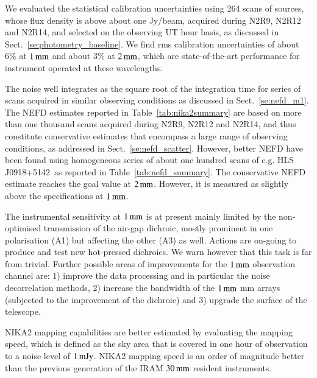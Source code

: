 \documentclass{aa}
\newcommand{\hls}{HLS\,J0918+5142}
\begin{document}
We evaluated the statistical calibration uncertainties using 264 
scans of sources, whose flux density is above about one Jy/beam,
  acquired during N2R9, N2R12 and N2R14, and selected on the observing UT hour basis, as discussed in
Sect.~\ref{se:photometry_baseline}. We find rms calibration
uncertainties of about $6\%$ at $1\,\rm{mm}$ and about $3\%$ at
$2\,\rm{mm}$, which are state-of-the-art performance for instrument
operated at these wavelengths. 


The noise well integrates as the square root of the integration time
for series of scans acquired in similar observing conditions as
discussed in Sect.~\ref{se:nefd_m1}. The NEFD estimates reported in
Table~\ref{tab:nika2summary} are based on more than one thousand scans
acquired during N2R9, N2R12 and N2R14, and thus constitute
conservative estimates that encompass a large range of observing
conditions, as addressed in Sect.~\ref{se:nefd_scatter}. However,
better NEFD have been found using homogeneous series of about one
hundred scans of e.g. \hls\, as reported in
Table~\ref{tab:nefd_summary}.  The conservative NEFD estimate reaches
the goal value at $2\,\rm{mm}$. However, it is measured as slightly
above the specifications at $1\,\rm{mm}$.


The instrumental sensitivity at $1\,\rm{mm}$ is at present mainly
limited by the non-optimised transmission of the air-gap dichroic,
mostly prominent in one polarisation (A1) but affecting the other
(A3) as well. Actions are on-going to produce and test new
hot-pressed dichroics. We warn however that this task is far from
trivial.
Further possible areas of improvements for the $1\,\rm{mm}$
observation channel are: 1) improve the data processing and in
particular the noise decorrelation methods, 2) increase the
bandwidth of the $1\,\rm{mm}$ mm arrays (subjected to the
improvement of the dichroic) and 3) upgrade the surface of the
telescope.
  
NIKA2 mapping capabilities are better estimated by evaluating the
mapping speed, which is defined as the sky area that is covered in one
hour of observation to a noise level of $1\,\rm{mJy}$. NIKA2 mapping
speed is an order of magnitude better than the previous generation of
the IRAM $30\,\rm{mm}$ resident instruments. 
\end{document}
